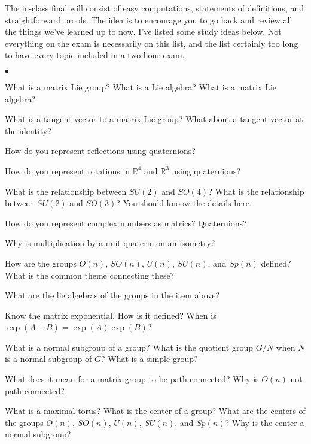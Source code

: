 \documentclass[minion,handout]{homework}
\def\Reals{\mathbb{R}}
\newenvironment{clist}%
{\bgroup\parskip 0pt\begin{list}{$\bullet$}{\partopsep 10pt\topsep 0pt\itemsep 0pt}}%
{\end{list}\egroup}%
\begin{document}
The in-class final will consist of easy computations, statements of definitions, 
and straightforward proofs.  The idea is to encourage you to go back
and review all the things we've learned up to now.  I've listed some study ideas below.
Not everything on the exam is necessarily on this list, and the list certainly too long to have
every topic included in a two-hour exam.

\begin{clist}

\item What is a matrix Lie group?  What is a Lie algebra?  What is a matrix Lie algebra?

\item What is a tangent vector to a matrix Lie group?  What about a tangent vector at the identity?

\item How do you represent reflections using quaternions?

\item How do you represent rotations in $\Reals^4$ and $\Reals^3$ using quaternions?

\item What is the relationship between $SU(2)$ and $SO(4)$?  What is the relationship between
$SU(2)$ and $SO(3)$?  You should knoow the details here.

\item How do you represent complex numbers as matrics?  Quaternions?

\item Why is multiplication by a unit quaterinion an isometry?

\item How are the groups $O(n)$, $SO(n)$, $U(n)$, $SU(n)$, and $Sp(n)$ defined?
What is the common theme connecting these?

\item What are the lie algebras of the groups in the item above? 

\item Know the matrix exponential.  How is it defined?  When is $\exp(A+B)=\exp(A)\exp(B)$?


\item What is a normal subgroup of a group?  What is the quotient group $G/N$ when
$N$ is a normal subgroup of $G$? What is a simple group?  

\item What does it mean for a matrix group to be path connected?  Why is $O(n)$ not
path connected?  

\item What is a maximal torus?  What is the center of a group?  What are the centers of 
the groups $O(n)$, $SO(n)$, $U(n)$, $SU(n)$, and $Sp(n)$?  Why is the center a normal subgroup?


\end{clist}
\end{document}

